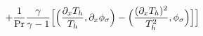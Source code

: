 \documentclass[preview]{standalone}
\newcommand{\dx}{\partial_x}
\begin{document}
\begin{align*}
\special{dvisvgm:raw <g id='unique000'>}\qquad+\frac{1}{\mathrm{Pr}}\frac{\gamma}{\gamma-1}\Big[\Big(\frac{\dx T_h}{T_h},\dx\phi_\sigma\Big)-\Big(\frac{(\dx T_h)^2}{T_h^2},\phi_\sigma\Big)\Big]\Big]\special{dvisvgm:raw </g>}
\end{align*}
\end{document}
